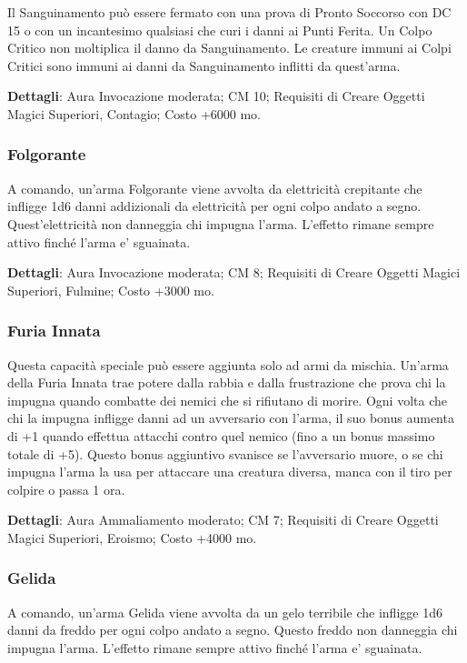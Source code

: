 \begin{multicols}{2}
Il Sanguinamento può essere fermato con una prova di Pronto Soccorso con DC 15 o con un incantesimo qualsiasi che curi i danni ai Punti Ferita. Un Colpo Critico non moltiplica il danno da Sanguinamento. Le creature immuni ai Colpi Critici sono immuni ai danni da Sanguinamento inflitti da quest'arma.

\textbf{Dettagli}: Aura Invocazione moderata; CM 10; Requisiti di Creare Oggetti Magici Superiori, Contagio; Costo +6000 mo.

\subsubsection{Folgorante}

A comando, un'arma Folgorante viene avvolta da elettricità crepitante che infligge 1d6 danni addizionali da elettricità per ogni colpo andato a segno. Quest'elettricità non danneggia chi impugna l'arma. L'effetto rimane sempre attivo finché l'arma e' sguainata.

\textbf{Dettagli}: Aura Invocazione moderata; CM 8; Requisiti di Creare Oggetti Magici Superiori, Fulmine; Costo +3000 mo.

\subsubsection{Furia Innata}

Questa capacità speciale può essere aggiunta solo ad armi da mischia. Un'arma della Furia Innata trae potere dalla rabbia e dalla frustrazione che prova chi la impugna quando combatte dei nemici che si rifiutano di morire. Ogni volta che chi la impugna infligge danni ad un avversario con l'arma, il suo bonus aumenta di +1 quando effettua attacchi contro quel nemico (fino a un bonus massimo totale di +5). Questo bonus aggiuntivo svanisce se l'avversario muore, o se chi impugna l'arma la usa per attaccare una creatura diversa, manca con il tiro per colpire o passa 1 ora.

\textbf{Dettagli}: Aura Ammaliamento moderato; CM 7; Requisiti di Creare Oggetti Magici Superiori, Eroismo; Costo +4000 mo.

\subsubsection{Gelida}

A comando, un'arma Gelida viene avvolta da un gelo terribile che infligge 1d6 danni da freddo per ogni colpo andato a segno. Questo freddo non danneggia chi impugna l'arma. L'effetto rimane sempre attivo finché l'arma e' sguainata.


\end{multicols}
